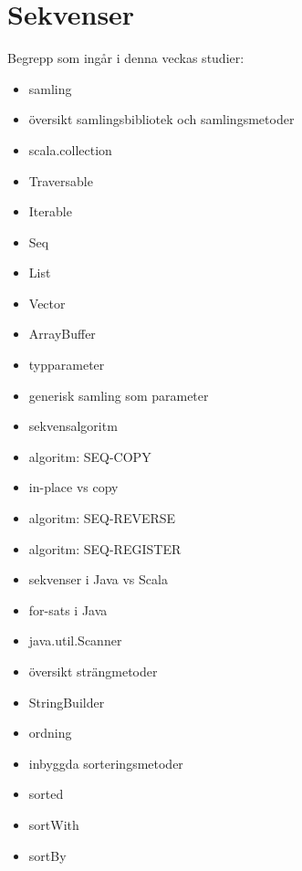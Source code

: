 \chapter{Sekvenser}\label{chapter:W06}
Begrepp som ingår i denna veckas studier:
\begin{itemize}[noitemsep,label={$\square$},leftmargin=*]
\item samling
\item översikt samlingsbibliotek och samlingsmetoder
\item scala.collection
\item Traversable
\item Iterable
\item Seq
\item List
\item Vector
\item ArrayBuffer
\item typparameter
\item generisk samling som parameter
\item sekvensalgoritm
\item algoritm: SEQ-COPY
\item in-place vs copy
\item algoritm: SEQ-REVERSE
\item algoritm: SEQ-REGISTER
\item sekvenser i Java vs Scala
\item for-sats i Java
\item java.util.Scanner
\item översikt strängmetoder
\item StringBuilder
\item ordning
\item inbyggda sorteringsmetoder
\item sorted
\item sortWith
\item sortBy\end{itemize}
